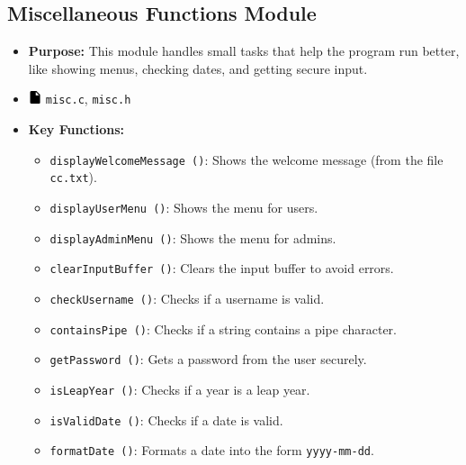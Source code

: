 \documentclass[12pt,a4paper]{report}
\begin{document}
\subsection{Miscellaneous Functions Module}
\begin{itemize}
    \item \normalsize \textbf{Purpose:} This module handles small tasks that help the program run better, like showing menus, checking dates, and getting secure input.
    \item \normalsize \includegraphics[width=0.03\textwidth]{../resources/assets/images/file_icon.png} \texttt{misc.c}, \texttt{misc.h}
    \item \normalsize \textbf{Key Functions:}
    \begin{itemize}
        \item \texttt{displayWelcomeMessage ()}: Shows the welcome message (from the file \texttt{cc.txt}).
        \item \texttt{displayUserMenu ()}: Shows the menu for users.
        \item \texttt{displayAdminMenu ()}: Shows the menu for admins.
        \item \texttt{clearInputBuffer ()}: Clears the input buffer to avoid errors.
        \item \texttt{checkUsername ()}: Checks if a username is valid.
        \item \texttt{containsPipe ()}: Checks if a string contains a pipe character.
        \item \texttt{getPassword ()}: Gets a password from the user securely.
        \item \texttt{isLeapYear ()}: Checks if a year is a leap year.
        \item \texttt{isValidDate ()}: Checks if a date is valid.
        \item \texttt{formatDate ()}: Formats a date into the form \texttt{yyyy-mm-dd}.
    \end{itemize}
\end{itemize}
\end{document}

